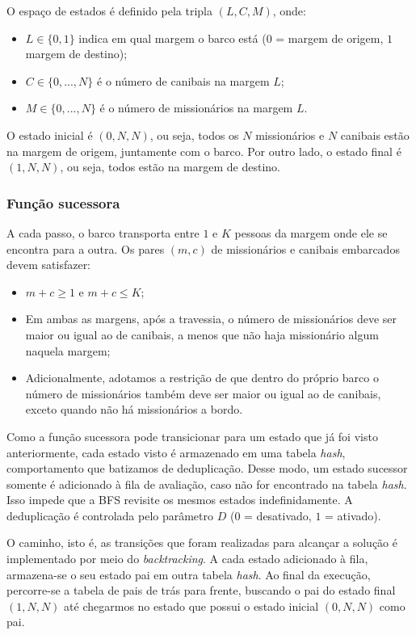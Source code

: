 \documentclass[12pt]{article}
\begin{document}
O espaço de estados é definido pela tripla $(L, C, M)$, onde:

\begin{itemize}
    \item $L \in \{0, 1\}$ indica em qual margem o barco está ($0$ = margem de origem, $1$ margem de destino);
    \item $C \in \{0, ..., N\}$ é o número de canibais na margem $L$;
    \item $M \in \{0, ..., N\}$ é o número de missionários na margem $L$.
\end{itemize}

O estado inicial é $(0, N, N)$, ou seja, todos os $N$ missionários e $N$ canibais estão na margem de origem, juntamente com o barco. Por outro lado, o estado final é $(1, N, N)$, ou seja, todos estão na margem de destino.

\subsubsection{Função sucessora}

A cada passo, o barco transporta entre $1$ e $K$ pessoas da margem onde ele se encontra para a outra. Os pares $(m, c)$ de missionários e canibais embarcados devem satisfazer:

\begin{itemize}
    \item $m + c \geq 1$ e $m + c \leq K$;
    \item Em ambas as margens, após a travessia, o número de missionários deve ser maior ou igual ao de canibais, a menos que não haja missionário algum naquela margem;
    \item Adicionalmente, adotamos a restrição de que dentro do próprio barco o número de missionários também deve ser maior ou igual ao de canibais, exceto quando não há missionários a bordo.
\end{itemize}

Como a função sucessora pode transicionar para um estado que já foi visto anteriormente, cada estado visto é armazenado em uma tabela \textit{hash}, comportamento que batizamos de deduplicação. Desse modo, um estado sucessor somente é adicionado à fila de avaliação, caso não for encontrado na tabela \textit{hash}. Isso impede que a BFS revisite os mesmos estados indefinidamente. A deduplicação é controlada pelo parâmetro $D$ ($0$ = desativado, $1$ = ativado). 

O caminho, isto é, as transições que foram realizadas para alcançar a solução é implementado por meio do \textit{backtracking}. A cada estado adicionado à fila, armazena-se o seu estado pai em outra tabela \textit{hash}. Ao final da execução, percorre-se a tabela de pais de trás para frente, buscando o pai do estado final $(1, N, N)$ até chegarmos no estado que possui o estado inicial $(0, N, N)$ como pai.
\end{document}
